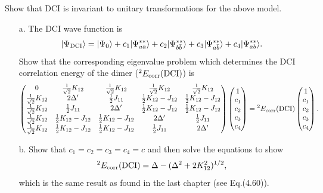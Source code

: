 \documentclass[a4paper]{book}
\newcounter{exercise}[chapter]
\newcommand{\corr}{{\rm corr}}
\newcommand{\DCI}{{\rm DCI}}
\begin{document}
	\begin{exercise}
	Show that DCI is invariant to unitary transformations for the above model.
	\begin{enumerate}
	
	\item[a.] The DCI wave function is
	\[
		| \Psi_{\DCI} \rangle = | \Psi_0 \rangle + c_1 | \Psi^{**}_{a\bar{a}} \rangle + c_2 | \Psi^{**}_{b \bar{b}} \rangle + c_3 | \Psi^{**}_{a\bar{b}} \rangle + c_4 | \Psi^{**}_{\bar{a}b}\rangle.
	\]
	Show that the corresponding eigenvalue problem which determines the DCI correlation energy of the dimer (${}^{2}E_{\corr}(\DCI)$) is
	\[
	\begin{pmatrix}
		0 & \frac{1}{\sqrt{2}} K_{12} & \frac{1}{\sqrt{2}}K_{12} & \frac{1}{\sqrt{2}} K_{12} & \frac{1}{\sqrt{2}}K_{12} \\
		\frac{1}{\sqrt{2}}K_{12} & 2\Delta^\prime & \frac{1}{2}J_{11} & \frac{1}{2}K_{12} - J_{12} & \frac{1}{2}K_{12} - J_{12} \\
		\frac{1}{\sqrt{2}}K_{12} & \frac{1}{2}J_{11} & 2\Delta^\prime & \frac{1}{2}K_{12} - J_{12} & \frac{1}{2}K_{12} - J_{12} \\
		\frac{1}{\sqrt{2}}K_{12} & \frac{1}{2}K_{12} - J_{12} & \frac{1}{2}K_{12} - J_{12} & 2\Delta^\prime & \frac{1}{2}J_{11} \\
		\frac{1}{\sqrt{2}}K_{12} & \frac{1}{2}K_{12} - J_{12} & \frac{1}{2}K_{12} - J_{12} & \frac{1}{2}J_{11} & 2\Delta^\prime
	\end{pmatrix} \begin{pmatrix}
	1 \\ c_1 \\ c_2 \\ c_3 \\ c_4
	\end{pmatrix} = {}^2 E_\corr (\DCI) \begin{pmatrix}
	1 \\ c_1 \\ c_2 \\ c_3 \\ c_4
	\end{pmatrix}.
	\]
	
	\item[b.] Show that $c_1 = c_2 = c_3 = c_4 = c$ and then solve the equations to show
	\[
		{}^{2}E_\corr(\DCI) = \Delta - ( \Delta^2 + 2 K^2_{12} )^{1/2},
	\]
	which is the same result as found in the last chapter (see Eq.(4.60)).
	\end{enumerate}
	\end{exercise}
	
\end{document}
